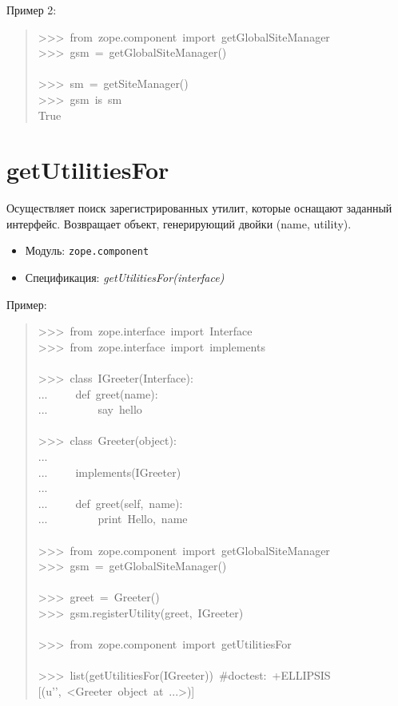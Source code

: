 \documentclass[a4paper,openany,twoside,final]{book}
\providecommand*{\DUroletitlereference}[1]{\textsl{#1}}
\begin{document}
Пример 2:

\begin{quote}{\ttfamily \raggedright \noindent
>{}>{}>~from~zope.component~import~getGlobalSiteManager\\
>{}>{}>~gsm~=~getGlobalSiteManager()\\
~\\
>{}>{}>~sm~=~getSiteManager()\\
>{}>{}>~gsm~is~sm\\
True
}
\end{quote}


\section*{getUtilitiesFor%
  \label{getutilitiesfor}%
}

Осуществляет поиск зарегистрированных утилит, которые оснащают
заданный интерфейс.  Возвращает объект, генерирующий двойки (name, utility).

\begin{itemize}

\item Модуль: \texttt{zope.component}

\item Спецификация: \DUroletitlereference{getUtilitiesFor(interface)}

\end{itemize}

Пример:

\begin{quote}{\ttfamily \raggedright \noindent
>{}>{}>~from~zope.interface~import~Interface\\
>{}>{}>~from~zope.interface~import~implements\\
~\\
>{}>{}>~class~IGreeter(Interface):\\
...~~~~~def~greet(name):\\
...~~~~~~~~~\textquotedbl{}say~hello\textquotedbl{}\\
~\\
>{}>{}>~class~Greeter(object):\\
...\\
...~~~~~implements(IGreeter)\\
...\\
...~~~~~def~greet(self,~name):\\
...~~~~~~~~~print~\textquotedbl{}Hello\textquotedbl{},~name\\
~\\
>{}>{}>~from~zope.component~import~getGlobalSiteManager\\
>{}>{}>~gsm~=~getGlobalSiteManager()\\
~\\
>{}>{}>~greet~=~Greeter()\\
>{}>{}>~gsm.registerUtility(greet,~IGreeter)\\
~\\
>{}>{}>~from~zope.component~import~getUtilitiesFor\\
~\\
>{}>{}>~list(getUtilitiesFor(IGreeter))~\#doctest:~+ELLIPSIS\\
{[}(u'{}',~<Greeter~object~at~...>){]}
}
\end{quote}
\end{document}

